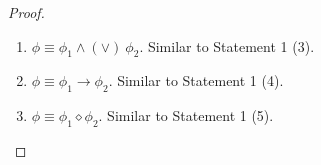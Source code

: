\documentclass[conference,compsoc, 10pt]{IEEEtran}
\newcommand {\qU} {{\overline{q}:=U[\overline{q}]}}
\newcommand {\cD } {{\mathcal{D}}}
\newcommand {\free }[1] {{\mathsf{free}\left(#1\right)}}
\newcommand {\vars } {\mathbf{V}}
\newcommand {\sem}[1] {\llbracket#1\rrbracket}
\newcommand{\sd}{\diamond}%
\begin{document}
\begin{appendices}
\begin{proof}
\begin{enumerate}
				\item $\phi \equiv \phi_1\wedge\!(\vee)\ \phi_2$. Similar to Statement 1 (3).
				
				\item $\phi \equiv \phi_1\rightarrow\phi_2$.  Similar to Statement 1 (4).
				
				\item $\phi \equiv \phi_1\sd\phi_2$. Similar to Statement 1 (5).
				

\end{enumerate}
\end{proof}
\end{appendices}
\end{document}

